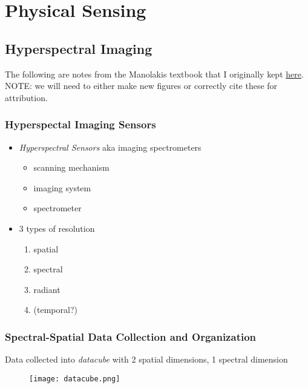 \chapter{Physical Sensing}



\section{Hyperspectral Imaging}

The following are notes from the Manolakis textbook that I originally kept \href{https://github.com/john-waczak/dissertation/blob/main/notes/remote_sensing/Manolakis/Introduction.md}{here}. NOTE: we will need to either make new figures or correctly cite these for attribution.

\subsection{Hyperspectal Imaging Sensors}

\begin{itemize}
\item \textit{Hyperspectral Sensors} aka imaging spectrometers
  \begin{itemize}
  \item scanning mechanism
  \item imaging system
  \item spectrometer
  \end{itemize}
\item 3 types of resolution
  \begin{enumerate}
    \item spatial
    \item spectral
    \item radiant
    \item (temporal?)
  \end{enumerate}
\end{itemize}

\subsection{Spectral-Spatial Data Collection and Organization}
Data collected into \textit{datacube} with 2 spatial dimensions, 1 spectral dimension

\begin{figure}[h]
  \texttt{[image: datacube.png]}
\end{figure}

